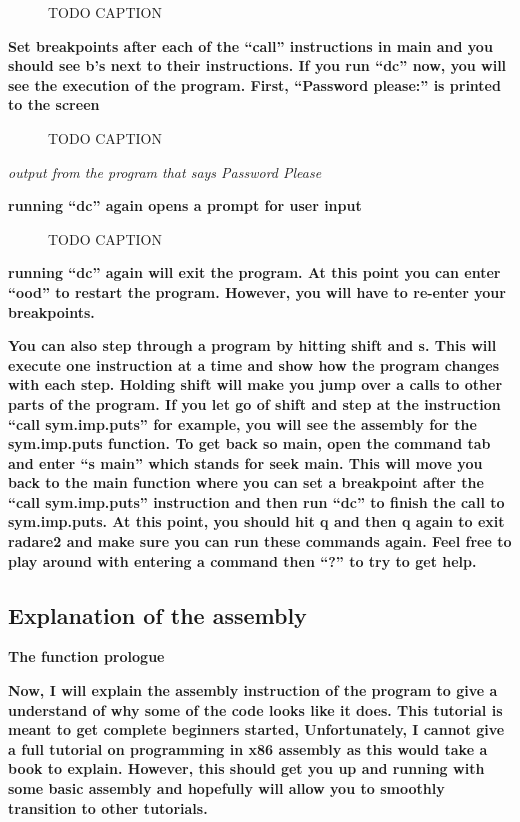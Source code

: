 \documentclass[letterpaper]{article}
\newcommand{\sitfig}[3]{
\begin{figure}[H]
\centering
\makebox[\textwidth][c]{
#2
}
\caption{#3}
\label{#1}
\end{figure}
}
\newcommand{\sitgfx}[4][scale=1.0]{
\sitfig{#3}{\texttt{[image: \#2]}}{#4}
}
\begin{document}
  
\sitgfx[width=5.8335in,height=3.6457in]{FINALWORKINGDOCFORMERLYPRECURSOR-img081.png}{fig:unk}{TODO CAPTION}
 

\textbf{Set breakpoints after each of the ``call'' instructions in main and you should see b's next to their
instructions. If you run ``dc'' now, you will see the execution of the program. First, ``Password please:'' is printed
to the screen}

  
\sitgfx[width=5.8335in,height=3.6457in]{FINALWORKINGDOCFORMERLYPRECURSOR-img082.png}{fig:unk}{TODO CAPTION}
 

\textit{output from the program that says Password Please}

\textbf{running ``dc'' again opens a prompt for user input}

  
\sitgfx[width=5.8335in,height=3.6457in]{FINALWORKINGDOCFORMERLYPRECURSOR-img085.png}{fig:unk}{TODO CAPTION}
 

\textbf{running ``dc'' again will exit the program. At this point you can enter ``ood'' to restart the program. However,
you will have to re-enter your breakpoints.}

\textbf{You can also step through a program by hitting shift and s. This will execute one instruction at a time and show
how the program changes with each step. Holding shift will make you jump over a calls to other parts of the program. If
you let go of shift and step at the instruction ``call sym.imp.puts'' for example, you will see the assembly for the
sym.imp.puts function. To get back so main, open the command tab and enter ``s main'' which stands for seek main. This
will move you back to the main function where you can set a breakpoint after the ``call sym.imp.puts'' instruction and
then run ``dc'' to finish the call to sym.imp.puts. At this point, you should hit q and then q again to exit radare2
and make sure you can run these commands again. Feel free to play around with entering a command then ``?'' to try to
get help.}

\subsection{Explanation of the assembly}

\textbf{The function prologue}

\textbf{Now, I will explain the assembly instruction of the program to give a understand of why some of the code looks
like it does. This tutorial is meant to get complete beginners started, Unfortunately, I cannot give a full tutorial on
programming in x86 assembly as this would take a book to explain. However, this should get you up and running with some
basic assembly and hopefully will allow you to smoothly transition to other tutorials.}
\end{document}
